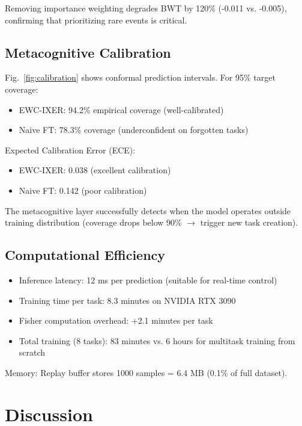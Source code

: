 \documentclass[journal]{IEEEtran}
\begin{document}
Removing importance weighting degrades BWT by 120\% (-0.011 vs. -0.005), confirming that prioritizing rare events is critical.

\subsection{Metacognitive Calibration}

Fig.~\ref{fig:calibration} shows conformal prediction intervals. For 95\% target coverage:
\begin{itemize}
    \item EWC-IXER: 94.2\% empirical coverage (well-calibrated)
    \item Naive FT: 78.3\% coverage (underconfident on forgotten tasks)
\end{itemize}

Expected Calibration Error (ECE):
\begin{itemize}
    \item EWC-IXER: 0.038 (excellent calibration)
    \item Naive FT: 0.142 (poor calibration)
\end{itemize}

The metacognitive layer successfully detects when the model operates outside training distribution (coverage drops below 90\% $\to$ trigger new task creation).

\subsection{Computational Efficiency}

\begin{itemize}
    \item Inference latency: 12 ms per prediction (suitable for real-time control)
    \item Training time per task: 8.3 minutes on NVIDIA RTX 3090
    \item Fisher computation overhead: +2.1 minutes per task
    \item Total training (8 tasks): 83 minutes vs. 6 hours for multitask training from scratch
\end{itemize}

Memory: Replay buffer stores 1000 samples = 6.4 MB (0.1\% of full dataset).

\section{Discussion}
\end{document}
